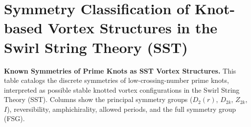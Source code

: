 \documentclass{article}
\begin{document}
\section{Symmetry Classification of Knot-based Vortex Structures in the Swirl String Theory (SST)}

\begin{table}[H]
\caption{
\textbf{Known Symmetries of Prime Knots as SST Vortex Structures.}
This table catalogs the discrete symmetries of low-crossing-number prime knots, interpreted as possible stable knotted vortex configurations in the Swirl String Theory (SST). Columns show the principal symmetry groups ($D_2(r)$, $D_{2k}$, $Z_{2k}$, $I$), reversibility, amphichirality, allowed periods, and the full symmetry group (FSG).
}
\centering

\renewcommand{\arraystretch}{1.15}
\setlength{\tabcolsep}{0.45em}


\end{table}
\end{document}
